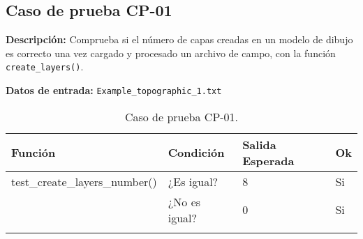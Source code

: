 \newpage
\subsection{Caso de prueba CP-01}

\textbf{Descripción:} Comprueba si el número de capas creadas en un modelo de dibujo es correcto una vez cargado y procesado un archivo de campo, con la función \texttt{create\_layers()}.

\textbf{Datos de entrada:} \texttt{Example\_topographic\_1.txt}


\begin{longtable}[]{@{}llll@{}}
\toprule
\begin{minipage}[b]{0.6\columnwidth}\raggedright\strut
Función\strut
\end{minipage} & \begin{minipage}[b]{0.20\columnwidth}\raggedright\strut
Condición\strut
\end{minipage} & \begin{minipage}[b]{0.15\columnwidth}\raggedright\strut
Salida Esperada\strut
\end{minipage} & \begin{minipage}[b]{0.05\columnwidth}\raggedright\strut
Ok\strut
\end{minipage}\tabularnewline
\midrule
\endhead
\begin{minipage}[t]{0.6\columnwidth}\raggedright\strut
test\_create\_layers\_number()\strut
\end{minipage} & \begin{minipage}[t]{0.20\columnwidth}\raggedright\strut
¿Es igual?\strut
\end{minipage} & \begin{minipage}[t]{0.15\columnwidth}\raggedright\strut
8\strut
\end{minipage} & \begin{minipage}[t]{0.05\columnwidth}\raggedright\strut
Si\strut
\end{minipage}\tabularnewline
\begin{minipage}[t]{0.6\columnwidth}\raggedright\strut
\strut
\end{minipage} & \begin{minipage}[t]{0.20\columnwidth}\raggedright\strut
¿No es igual?\strut
\end{minipage} & \begin{minipage}[t]{0.15\columnwidth}\raggedright\strut
0\strut
\end{minipage} & \begin{minipage}[t]{0.05\columnwidth}\raggedright\strut
Si\strut
\end{minipage}\tabularnewline

\bottomrule
\caption{Caso de prueba CP-01.}
\end{longtable}

